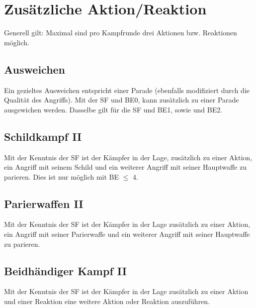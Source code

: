 %


\section[Zusätzliche Aktion/Reaktion]{\color{black} Zusätzliche
Aktion/Reaktion}
\label{bkm:RefHeading39621231957535}{\sffamily\color{black}
Generell gilt: Maximal sind pro Kampfrunde drei Aktionen bzw. Reaktionen
möglich.}

\subsection[Ausweichen]{\color{black} Ausweichen}
\label{bkm:RefHeading36231231957535}{\sffamily\color{black}
Ein gezieltes Ausweichen entspricht einer Parade (ebenfalls modifiziert
durch die Qualität des Angriffs). Mit der SF
 und BE0, kann zusätzlich zu einer
Parade ausgewichen werden. Dasselbe gilt für die SF
 und BE1, sowie
 und BE2.}

\subsection[Schildkampf II]{\color{black} Schildkampf II}
{\sffamily\color{black}
Mit der Kenntnis der SF  ist der
Kämpfer in der Lage, zusätzlich zu einer Aktion, ein Angriff mit seinem
Schild und ein weiterer Angriff mit seiner Hauptwaffe zu parieren. Dies
ist nur möglich mit BE\textrm{ ${\leq}$ }4.}

\subsection[Parierwaffen II]{\color{black} Parierwaffen II}
{\sffamily\color{black}
Mit der Kenntnis der SF  ist der
Kämpfer in der Lage zusätzlich zu einer Aktion, ein Angriff mit seiner
Parierwaffe und ein weiterer Angriff mit seiner Hauptwaffe zu
parieren.}

\subsection[Beidhändiger Kampf II]{\color{black} Beidhändiger Kampf II}
{\sffamily\color{black}
Mit der Kenntnis der SF  ist
der Kämpfer in der Lage zusätzlich zu einer Aktion und einer Reaktion
eine weitere Aktion oder Reaktion auszuführen.}

